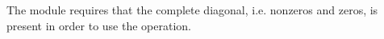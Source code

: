{\warn} The {\sunmatslunrloc} module requires that the complete diagonal, i.e. nonzeros and zeros,
is present in order to use the  operation.






